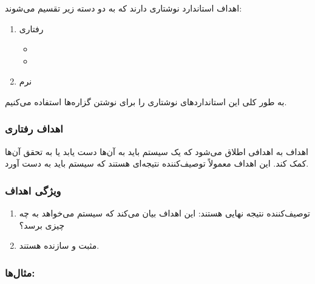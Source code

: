 اهداف استاندارد نوشتاری دارند که به دو دسته زیر تقسیم می‌شوند:

\begin{enumerate}
    \item رفتاری
    \begin{itemize}
        \item {}
        \item {}
    \end{itemize}
    \item نرم
\end{enumerate}

به طور کلی این استاندارد‌های نوشتاری را برای نوشتن گزاره‌ها استفاده می‌کنیم.

\subsubsection{اهداف رفتاری }

اهداف  به اهدافی اطلاق می‌شود که یک سیستم باید به آن‌ها دست یابد یا
به تحقق آن‌ها کمک کند. این اهداف معمولاً توصیف‌کننده نتیجه‌ای هستند که سیستم
باید به دست آورد.

\subsubsection*{ویژگی اهداف }

\begin{enumerate}
    \item توصیف‌کننده نتیجه نهایی هستند: این اهداف بیان می‌کند که سیستم می‌خواهد
    به چه چیزی برسد؟
    \item مثبت و سازنده هستند.
\end{enumerate}

\subsubsection*{مثال‌ها:}

